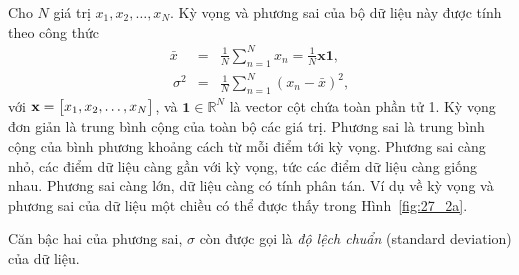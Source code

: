 Cho $N$ giá trị $x_1, x_2, \dots, x_N$. {Kỳ vọng} và {phương sai}
của bộ dữ liệu này được tính theo công thức
\begin{eqnarray}
\bar{x} &=& \frac{1}{N}\sum_{n=1}^N x_n = \frac{1}{N}\mathbf{x1},\\\
\sigma^2 &=& \frac{1}{N} \sum_{n=1}^N (x_n - \bar{x})^2,
\end{eqnarray}
với $\mathbf{x} = \left[\begin{matrix} x_1, x_2, \dots, x_N\end{matrix}\right] $, và $\mathbf{1} \in \mathbb{R}^N$ là
vector cột chứa toàn phần tử 1. Kỳ vọng đơn giản là trung bình cộng của toàn bộ
các giá trị. Phương sai là trung bình cộng của bình phương khoảng cách từ mỗi
điểm tới kỳ vọng. Phương sai càng nhỏ, các điểm dữ liệu càng gần với kỳ vọng,
tức các điểm dữ liệu càng giống nhau. Phương sai càng lớn, dữ liệu càng có tính
phân tán. Ví dụ về kỳ vọng và phương sai của dữ liệu một chiều có thể được thấy
trong Hình~\ref{fig:27_2a}.

Căn bậc hai của phương sai, $\sigma$ còn được gọi là \textit{độ lệch chuẩn} (standard deviation) của
dữ liệu.


